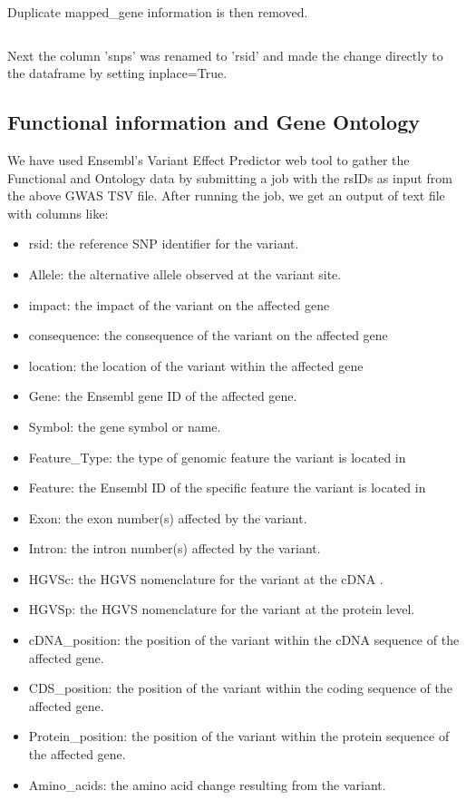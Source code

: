 \documentclass[12pt,a4paper]{article}
\newcommand{\mintfile}[1]{
\begin{tcolorbox}[colback=gray!5!white,%
	grow to left by=20mm,
    grow to right by=20mm,
    sharp corners]{{    \small \inputminted[breaklines]{python}{#1}		}}
\end{tcolorbox}}
\newcommand{\subsect}[1]{
\FloatBarrier %
\hypertarget{#1}{
\subsection{#1}\label{#1}}
}
\begin{document}
\mintfile{code_snippets/placeholder.py}
Duplicate mapped\_gene information is then removed.

\mintfile{code_snippets/placeholder.py}
Next the column 'snps' was renamed to 'rsid' and made the change directly to the dataframe by setting inplace=True.


\subsect{Functional information and Gene Ontology}

We have used Ensembl's Variant Effect Predictor web tool to gather the Functional and Ontology data by
submitting a job with the rsIDs as input from the above GWAS TSV file.
After running the job, we get an output of text file with columns like:

\begin{itemize}

\item rsid: the reference SNP identifier for the variant.
\item Allele: the alternative allele observed at the variant site.
\item impact: the impact of the variant on the affected gene
\item consequence: the consequence of the variant on the affected gene
\item location: the location of the variant within the affected gene
\item Gene: the Ensembl gene ID of the affected gene.
\item Symbol: the gene symbol or name.
\item Feature\_Type: the type of genomic feature the variant is located in
\item Feature: the Ensembl ID of the specific feature the variant is located in
\item Exon: the exon number(s) affected by the variant.
\item Intron: the intron number(s) affected by the variant.
\item HGVSc: the HGVS nomenclature for the variant at the cDNA .
\item HGVSp: the HGVS nomenclature for the variant at the protein level.
\item cDNA\_position: the position of the variant within the cDNA sequence of the affected gene.
\item CDS\_position: the position of the variant within the coding sequence of the affected gene.
\item Protein\_position: the position of the variant within the protein sequence of the affected gene.
\item Amino\_acids: the amino acid change resulting from the variant.

\end{itemize}
\end{document}
